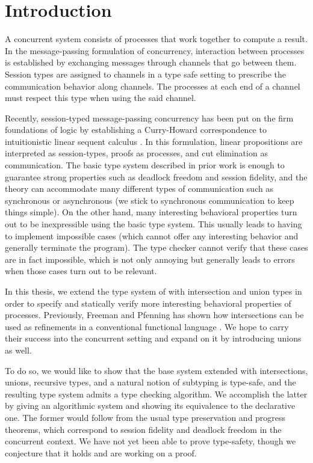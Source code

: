 
\chapter{Introduction}

A concurrent system consists of processes that work together to compute a result. In the message-passing formulation of concurrency, interaction between processes is established by exchanging messages through channels that go between them. Session types are assigned to channels in a type safe setting to prescribe the communication behavior along channels. The processes at each end of a channel must respect this type when using the said channel.

Recently, session-typed message-passing concurrency has been put on the firm foundations of logic by establishing a Curry-Howard correspondence to intuitionistic linear sequent calculus \cite{CairesP10, PfenningG15, Honda93}. In this formulation, linear propositions are interpreted as session-types, proofs as processes, and cut elimination as communication. The basic type system described in prior work is enough to guarantee strong properties such as deadlock freedom and session fidelity, and the theory can accommodate many different types of communication such as synchronous or asynchronous (we stick to synchronous communication to keep things simple). On the other hand, many interesting behavioral properties turn out to be inexpressible using the basic type system. This usually leads to having to implement impossible cases (which cannot offer any interesting behavior and generally terminate the program). The type checker cannot verify that these cases are in fact impossible, which is not only annoying but generally leads to errors when those cases turn out to be relevant.

In this thesis, we extend the type system of \cite{PfenningG15} with intersection and union types in order to specify and statically verify more interesting behavioral properties of processes. Previously, Freeman and Pfenning has shown how intersections can be used as refinements in a conventional functional language \cite{FreemanP91}. We hope to carry their success into the concurrent setting and expand on it by introducing unions as well.

To do so, we would like to show that the base system extended with intersections, unions, recursive types, and a natural notion of subtyping is type-safe, and the resulting type system admits a type checking algorithm. We accomplish the latter by giving an algorithmic system and showing its equivalence to the declarative one. The former would follow from the usual type preservation and progress theorems, which correspond to session fidelity and deadlock freedom in the concurrent context. We have not yet been able to prove type-safety, though we conjecture that it holds and are working on a proof.

